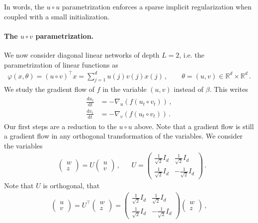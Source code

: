 \documentclass[11pt,reqno]{article}
\newcommand{\diff}{\mathrm{d}}
\newcommand{\R}{\mathbb{R}}
\numberwithin{equation}{section}
\theoremstyle{plain}
\theoremstyle{definition}
\theoremstyle{remark}
\begin{document}
In words, the $u \circ u$ parametrization enforces a sparse implicit regularization when coupled with a small initialization. 

\paragraph{The $u \circ v$ parametrization.} We now consider diagonal linear networks of depth $L = 2$, i.e. the parametrization of linear functions as 
\begin{align*}
	\varphi(x,\theta) = (u \circ v)^\top x = \sum_{j=1}^{d} u(j) v(j) x(j) \, ,  \qquad \theta = (u,v) \in \R^{d} \times \R^{d} \, .
\end{align*} 
We study the gradient flow of $f$ in the variable $(u,v)$ instead of $\beta$. This writes
\begin{align}
	\label{eq:gradient-flow-dln-uv}
	\begin{split}
	\frac{\diff u_t}{\diff t} &= - \nabla_u \left( f(u_t\circ v_t) \right) \, , \\
	\frac{\diff v_t}{\diff t} &= - \nabla_v \left( f(u_t\circ v_t) \right) \, .
	\end{split}
\end{align}
Our first steps are a reduction to the $u \circ u$ above. Note that a gradient flow is still a gradient flow in any orthogonal transformation of the variables. We consider the variables 
\begin{align*}
	&\begin{pmatrix}
		w \\ z
	\end{pmatrix} = U \begin{pmatrix}
		u \\ v
	\end{pmatrix} \, , &&U = \begin{pmatrix}
		\frac{1}{\sqrt{2}} I_d & \frac{1}{\sqrt{2}} I_d \\
		\frac{1}{\sqrt{2}} I_d & -\frac{1}{\sqrt{2}} I_d 
	\end{pmatrix} \, .
\end{align*}
Note that $U$ is orthogonal, that 
\begin{align*}
	\begin{pmatrix}
		u \\ v
	\end{pmatrix} = U^\top \begin{pmatrix}
		w \\ z
	\end{pmatrix} = \begin{pmatrix}
		\frac{1}{\sqrt{2}} I_d & \frac{1}{\sqrt{2}} I_d \\
		\frac{1}{\sqrt{2}} I_d & -\frac{1}{\sqrt{2}} I_d 
	\end{pmatrix} \begin{pmatrix}
		w \\ z
	\end{pmatrix} \, ,
\end{align*}
\end{document}
